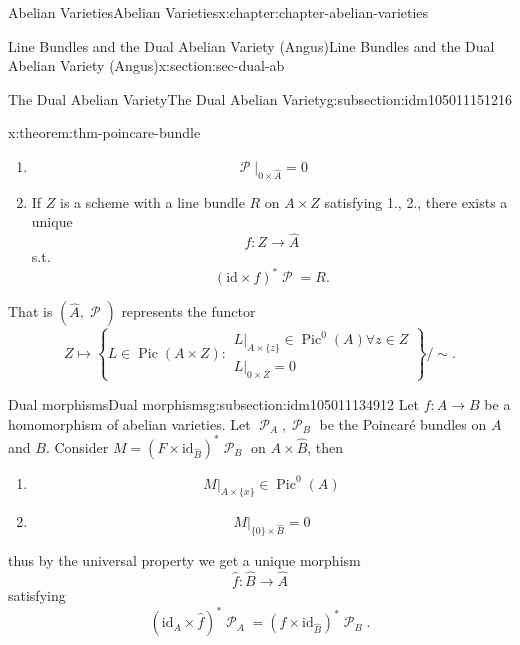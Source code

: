 \documentclass[oneside,10pt,]{book}
\numberwithin{equation}{section}
\newcommand{\sheaf}[1]{\operatorname{\mathcal{#1}}}
\newcommand{\id}{\mathrm{id}}
\DeclareMathOperator{\Pic}{Pic}
\begin{document}
\begin{chapterptx}{Abelian Varieties}{}{Abelian Varieties}{}{}{x:chapter:chapter-abelian-varieties}
\begin{sectionptx}{Line Bundles and the Dual Abelian Variety (Angus)}{}{Line Bundles and the Dual Abelian Variety (Angus)}{}{}{x:section:sec-dual-ab}
\begin{subsectionptx}{The Dual Abelian Variety}{}{The Dual Abelian Variety}{}{}{g:subsection:idm105011151216}
\begin{theorem}{}{}{x:theorem:thm-poincare-bundle}
\begin{enumerate}
%
\item{}%
\begin{equation*}
\sheaf P|_{0\times \hat A} = 0
\end{equation*}
%
\item{}If \(Z\) is a  scheme with a line bundle \(R\) on \(A\times Z\) satisfying 1., 2., there exists a unique%
\begin{equation*}
f\colon Z\to \hat A
\end{equation*}
s.t.%
\begin{equation*}
(\id\times f)^* \sheaf P = R\text{.}
\end{equation*}
%
\end{enumerate}
That is \((\hat A, \sheaf P)\)  represents the functor%
\begin{equation*}
Z \mapsto \left\{ L\in \Pic (A\times Z) : \substack{ L|_{A\times \{z\}} \in \Pic^0(A) \forall z\in Z \\L|_{ 0 \times Z } = 0}\right\}/\sim\text{.}
\end{equation*}
%
\end{theorem}
\end{subsectionptx}
%
%
\typeout{************************************************}
\typeout{************************************************}
%
\begin{subsectionptx}{Dual morphisms}{}{Dual morphisms}{}{}{g:subsection:idm105011134912}
Let \(f\colon A\to B\) be a homomorphism of abelian varieties. Let \(\sheaf P_A,\sheaf P_B\) be the Poincaré bundles on  \(A\) and \(B\). Consider \(M=    (F\times \id_{\hat B})^* \sheaf P_B\) on \(A\times \hat B\), then%
\begin{enumerate}
\item{}%
\begin{equation*}
M|_{A\times \{x\}} \in \Pic^0(A)
\end{equation*}
%
\item{}%
\begin{equation*}
M|_{\{0\} \times \hat B} = 0
\end{equation*}
%
\end{enumerate}
thus by the universal property we get a unique morphism%
\begin{equation*}
\hat f\colon \hat B \to \hat A
\end{equation*}
satisfying%
\begin{equation*}
(\id_A\times \hat f)^* \sheaf P_A = (f\times \id_{\hat B})^*\sheaf P_B\text{.}
\end{equation*}

\end{subsectionptx}
\end{sectionptx}
\end{chapterptx}
\end{document}
